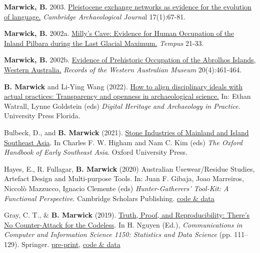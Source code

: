 \documentclass[11pt,article,oneside]{memoir}
\begin{document}
{{{{\ind \textbf{Marwick, B.} 2003. \href{http://faculty.washington.edu/bmarwick/PDFs/Marwick_2003_CAJ.pdf}{Pleistocene exchange networks as evidence for the evolution of language.} \textit{Cambridge Archaeological Journa}l 17(1):67-81.

\ind \textbf{Marwick, B.} 2002a. \href{http://faculty.washington.edu/bmarwick/PDFs/Marwick_2002_Tempus.pdf}{Milly's Cave: Evidence for Human Occupation of the Inland Pilbara during the Last Glacial Maximum.} \textit{Tempus} 21-33.

\ind \textbf{Marwick, B.} 2002b. \href{http://faculty.washington.edu/bmarwick/PDFs/Marwick_2002_RWAM.pdf}{Evidence of Prehistoric Occupation of the Abrolhos Islands, Western Australia.} \textit{Records of the Western Australian Museum} 20(4):461-464.

\bigskip


\ind \textbf{B. Marwick} and Li-Ying Wang (2022). \href{https://osf.io/preprints/socarxiv/s8z6u}{How to align disciplinary ideals with actual practices: Transparency and openness in archaeological science.} In: Ethan Watrall, Lynne Goldstein (eds) \textit{Digital Heritage and Archaeology in Practice}. University Press Florida.

\ind Bulbeck, D., and \textbf{B. Marwick} (2021). \href{https://doi.org/10.1093/oxfordhb/9780199355358.013.15}{Stone Industries of Mainland and Island Southeast Asia}. In Charles F. W. Higham and Nam C. Kim (eds) \textit{The Oxford Handbook of Early Southeast Asia}. Oxford University Press.

\ind Hayes, E., R. Fullagar, \textbf{B. Marwick} (2020) Australian Usewear/Residue Studies, Artefact Design and Multi-purpose Tools. In: Juan F. Gibaja, Joao Marreiros, Niccolò Mazzucco, Ignacio Clemente (eds) \textit{Hunter-Gatherers’ Tool-Kit: A Functional Perspective}. Cambridge Scholars Publishing. \href{https://doi.org/x10.17605/OSF.IO/MYBG2}{code \& data}

\ind Gray, C. T., \& \textbf{B. Marwick} (2019). \href{https://doi.org/10.1007/978-981-15-1960-4_8}{Truth, Proof, and Reproducibility: There’s No Counter-Attack for the Codeless}. In H. Nguyen (Ed.), \textit{Communications in Computer and Information Science 1150: Statistics and Data Science} (pp. 111–129). Springer.  \href{https://arxiv.org/abs/1907.05947}{pre-print}, \href{https://github.com/softloud/proof}{code \& data}

}}}}
\end{document}
